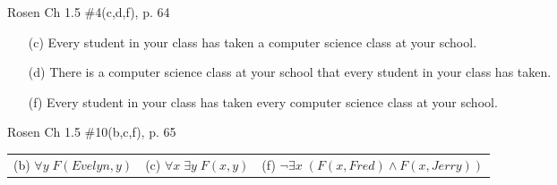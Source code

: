 \documentclass[10pt,addpoints]{exam}
\newcommand{\ra}{\rightarrow}
\begin{document}
\begin{questions}
\question[6] Rosen Ch 1.5 \#4(c,d,f), p. 64
    \ifprintanswers
        \vspace{-12pt}
    \fi
\begin{solution}
    \begin{itemize}[itemsep=0pt,parsep=0pt,topsep=0pt,partopsep=0pt]
       \item[(c)] Every student in your class has taken a computer science class at your school.
       \item[(d)] There is a computer science class at your school that every student in your class has taken.
       \item[(f)] Every student in your class has taken every computer science class at your school.
    \end{itemize}
\end{solution}



\question[6] Rosen Ch 1.5 \#10(b,c,f), p. 65
    \ifprintanswers
        \vspace{-12pt}
    \fi
\begin{solution}
	\begin{tabular}{lll} 
		(b) $\forall y\; F(Evelyn, y)$ & (c) $\forall x\; \exists y\; F(x,y)$ & (f) $\neg \exists x\; (F(x, Fred) \wedge F(x,Jerry))$
	\end{tabular}
\end{solution}




\end{questions}
\end{document}
